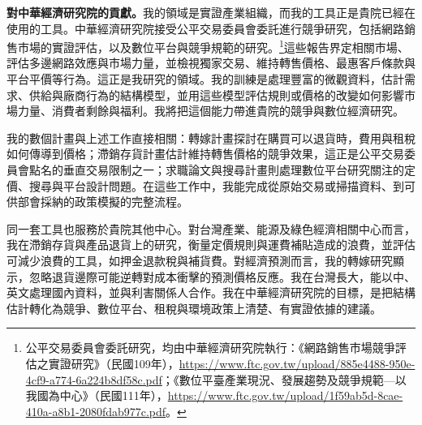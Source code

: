 \documentclass[11pt,letterpaper]{article}
\begin{document}
\medskip
\noindent\textbf{對中華經濟研究院的貢獻。}我的領域是實證產業組織，而我的工具正是貴院已經在使用的工具。中華經濟研究院接受公平交易委員會委託進行競爭研究，包括網路銷售市場的實證評估，以及數位平台與競爭規範的研究。\footnote{公平交易委員會委託研究，均由中華經濟研究院執行：《網路銷售市場競爭評估之實證研究》（民國109年），\url{https://www.ftc.gov.tw/upload/885e4488-950e-4cf9-a774-6a224b8df58c.pdf}；《數位平臺產業現況、發展趨勢及競爭規範—以我國為中心》（民國111年），\url{https://www.ftc.gov.tw/upload/1f59ab5d-8cae-410a-a8b1-2080fdab977c.pdf}。}這些報告界定相關市場、評估多邊網路效應與市場力量，並檢視獨家交易、維持轉售價格、最惠客戶條款與平台平價等行為。這正是我研究的領域。我的訓練是處理豐富的微觀資料，估計需求、供給與廠商行為的結構模型，並用這些模型評估規則或價格的改變如何影響市場力量、消費者剩餘與福利。我將把這個能力帶進貴院的競爭與數位經濟研究。

我的數個計畫與上述工作直接相關：轉嫁計畫探討在購買可以退貨時，費用與租稅如何傳導到價格；滯銷存貨計畫估計維持轉售價格的競爭效果，這正是公平交易委員會點名的垂直交易限制之一；求職論文與搜尋計畫則處理數位平台研究關注的定價、搜尋與平台設計問題。在這些工作中，我能完成從原始交易或掃描資料、到可供部會採納的政策模擬的完整流程。

同一套工具也服務於貴院其他中心。對台灣產業、能源及綠色經濟相關中心而言，我在滯銷存貨與產品退貨上的研究，衡量定價規則與運費補貼造成的浪費，並評估可減少浪費的工具，如押金退款稅與補貨費。對經濟預測而言，我的轉嫁研究顯示，忽略退貨邊際可能逆轉對成本衝擊的預測價格反應。我在台灣長大，能以中、英文處理國內資料，並與利害關係人合作。我在中華經濟研究院的目標，是把結構估計轉化為競爭、數位平台、租稅與環境政策上清楚、有實證依據的建議。
\end{document}
